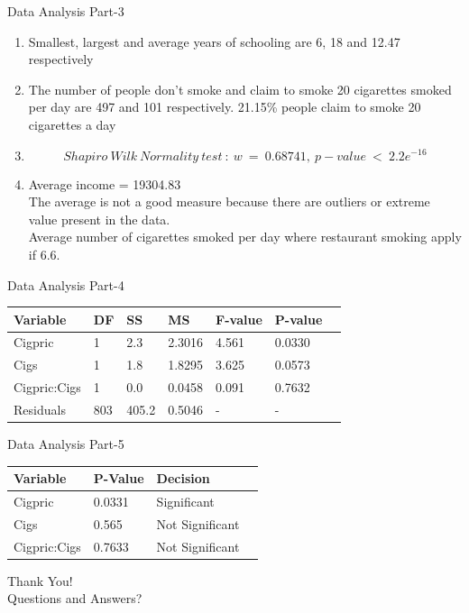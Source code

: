 \documentclass[aspectratio=169]{beamer}
\begin{document}
\begin{frame}{Data Analysis Part-3}
	
	\begin{enumerate}[I]
		\item Smallest, largest and average years of schooling are 6, 18 and 12.47 respectively 
		\item The number of people don't smoke and claim to smoke 20 cigarettes smoked per day are 497 and 101 respectively. 21.15\% people claim to smoke 20 cigarettes a day 
		\item $$ Shapiro\ Wilk\ Normality\ test\ :\ w\ =\ 0.68741,\ p-value\ <\ 2.2e^{-16} $$
		\item Average income = 19304.83 \\
		The average is not a good measure because there are outliers or extreme value present in the data. \\ 
		Average number of cigarettes smoked per day where restaurant smoking apply if 6.6. 
	\end{enumerate}
	
\end{frame}
\begin{frame}{Data Analysis Part-4}
	\begin{tabular}{ |l |l |l |l |l |l |l |} 
		\hline
		Variable & DF & SS & MS & F-value & P-value \\ 
		\hline
		Cigpric & 1 & 2.3 & 2.3016 & 4.561 & 0.0330 \\ 
		\hline
		Cigs & 1 & 1.8 & 1.8295 & 3.625 & 0.0573 \\ 
		\hline
		Cigpric:Cigs & 1 & 0.0 & 0.0458 & 0.091 & 0.7632 \\
		\hline
		Residuals & 803 & 405.2 & 0.5046 & - & - \\
	\end{tabular}
	
	
\end{frame}
\begin{frame}{Data Analysis Part-5}
	\begin{tabular}{ |l |l |l |l |} 
		\hline
		Variable & P-Value & Decision \\ 
		\hline
		Cigpric & 0.0331 & Significant \\ 
		\hline
		Cigs & 0.565 & Not Significant \\ 
		\hline
		Cigpric:Cigs & 0.7633 & Not Significant \\
		\hline
	\end{tabular}
	
	
\end{frame}
\begingroup
{}
\begin{frame} [c] { }
	
	\centering
	\large  Thank You! \\
	\centering
	\bigskip
	Questions and Answers?	
\end{frame}
\endgroup
\end{document}
